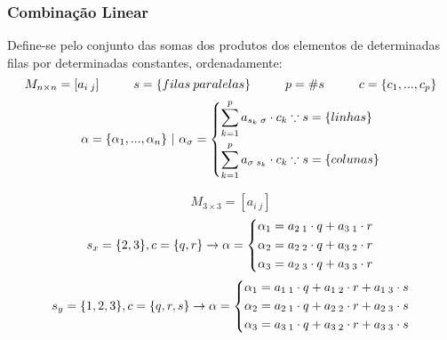     \subsubsection{Combinação Linear}
        Define-se pelo conjunto das somas dos produtos dos elementos de determinadas filas por determinadas constantes, ordenadamente:
        \[ M_{n \times n} = [a_{i \; j}] \hphantom{---} s=\{filas \: paralelas \} \hphantom{---} p = \# s \hphantom{---} c = \{ c_1,...,c_p \}\]
        \[ \alpha = \{ \alpha_1, ..., \alpha_n \} \ | \ \alpha_{\sigma} =  \begin{dcases}  \displaystyle\sum_{k=1}^{p} {a_{s_k \; \sigma} \cdot c_k} \because s = \{linhas\} \\ \displaystyle\sum_{k=1}^{p} {a_{\sigma \; s_k} \cdot c_k} \because s = \{colunas\} \end{dcases} \]

        \eg
        \[ M_{3 \times 3} = [a_{i \; j}] \]
        \[ s_{x} = \{ 2,3 \}, c=\{q,r\} \rightarrow \alpha = \begin{dcases} \alpha_1 = a_{2 \; 1} \cdot q + a_{3 \; 1} \cdot r \\ \alpha_2 = a_{2 \; 2} \cdot q + a_{3 \; 2} \cdot r \\ \alpha_3 = a_{2 \; 3} \cdot q + a_{3 \; 3} \cdot r \end{dcases} \]
        \[ s_{y} = \{1,2,3\}, c=\{q,r,s\} \rightarrow \alpha = \begin{dcases} \alpha_{1} = a_{1 \; 1} \cdot q + a_{1 \; 2} \cdot r + a_{1 \; 3} \cdot s \\ \alpha_{2} = a_{2 \; 1} \cdot q + a_{2 \; 2} \cdot r + a_{2 \; 3} \cdot s \\ \alpha_{3} = a_{3 \; 1} \cdot q + a_{3 \; 2} \cdot r + a_{3 \; 3} \cdot s \end{dcases} \]
